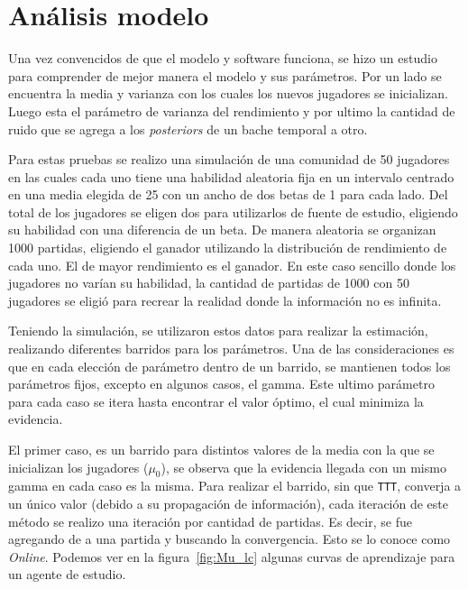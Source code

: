 \documentclass[11pt,twoside,spanish]{report} %
\begin{document}
\section{An\'alisis modelo}

Una vez convencidos de que el modelo y software funciona, se hizo un estudio para comprender de mejor manera el modelo y sus par\'ametros.
Por un lado se encuentra la media y varianza con los cuales los nuevos jugadores se inicializan.
Luego esta el par\'ametro de varianza del rendimiento y por ultimo la cantidad de ruido que se agrega a los \textit{posteriors} de un bache temporal a otro.

Para estas pruebas se realizo una simulaci\'on de una comunidad de 50 jugadores en las cuales cada uno tiene una habilidad aleatoria fija en un intervalo centrado en una media elegida de 25 con un ancho de dos betas de 1 para cada lado.
Del total de los jugadores se eligen dos para utilizarlos de fuente de estudio, eligiendo su habilidad con una diferencia de un beta.
De manera aleatoria se organizan 1000 partidas, eligiendo el ganador utilizando la distribuci\'on de rendimiento de cada uno.
El de mayor rendimiento es el ganador.
En este caso sencillo donde los jugadores no var\'ian su habilidad, la cantidad de partidas de 1000 con 50 jugadores se eligi\'o para recrear la realidad donde la informaci\'on no es infinita.

Teniendo la simulaci\'on, se utilizaron estos datos para realizar la estimaci\'on, realizando diferentes barridos para los par\'ametros.
Una de las consideraciones es que en cada elecci\'on de par\'ametro dentro de un barrido, se mantienen todos los par\'ametros fijos,  excepto en algunos casos, el gamma.
Este ultimo par\'ametro para cada caso se itera hasta encontrar el valor \'optimo, el cual minimiza la evidencia.

El primer caso, es  un barrido para distintos valores de la media con la que se inicializan los jugadores ($\mu_0$), se observa que la evidencia llegada con un mismo gamma en cada caso es la misma. Para realizar el barrido, sin que \texttt{TTT}, converja a un \'unico valor (debido a su propagaci\'on de informaci\'on), cada iteraci\'on de este m\'etodo se realizo una iteraci\'on por cantidad de partidas.
Es decir, se fue agregando de a una partida y buscando la convergencia.
Esto se lo conoce como \textit{Online}.
Podemos ver en la figura~\ref{fig:Mu_lc} algunas curvas de aprendizaje para un agente de estudio.
\end{document}
